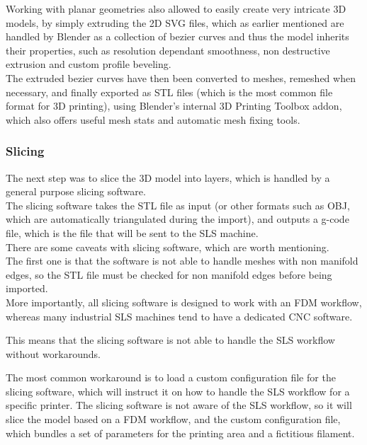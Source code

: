 \documentclass{article}
\begin{document}
          Working with planar geometries also allowed to easily create very intricate 3D models, by simply extruding the 2D SVG files, 
          which as earlier mentioned are handled by Blender as a collection of bezier curves and thus the model inherits their properties, such as resolution 
          dependant smoothness, non destructive extrusion and custom profile beveling. \\
  
          The extruded bezier curves have then been converted to meshes, remeshed when necessary, and finally 
          exported as STL files (which is the most common file format for 3D printing), using 
          Blender's internal 3D Printing Toolbox addon, which also offers useful mesh stats and 
          automatic mesh fixing tools. \\
          
          \subsubsection{Slicing\label{Slicing}}
          
          The next step was to slice the 3D model into layers, which is handled by a general purpose slicing software. \\
  
          The slicing software takes the STL file as input (or other formats such as OBJ, which are
          automatically triangulated during the import), and outputs a g-code file, which is the file that will be sent to the SLS machine. \\
  
          There are some caveats with slicing software, which are worth mentioning. \\
  
          The first one is that the software is not able to handle meshes with non manifold edges, so 
          the STL file must be checked for non manifold edges before being imported. \\ 
  
          More importantly, all slicing software is designed to work with an FDM workflow, whereas 
          many industrial SLS machines tend to have a dedicated CNC software. 
  
          This means that the slicing software is not able to handle the SLS workflow without workarounds. 
  
          The most common workaround is to load a custom configuration file for the slicing software, 
          which will instruct it on how to handle the SLS workflow for a specific printer. 
          The slicing software is not aware of the SLS workflow, so it will slice the model 
          based on a FDM workflow, and the custom configuration file, which bundles a set of 
          parameters for the printing area and a fictitious filament. \\ 
  
\end{document}
